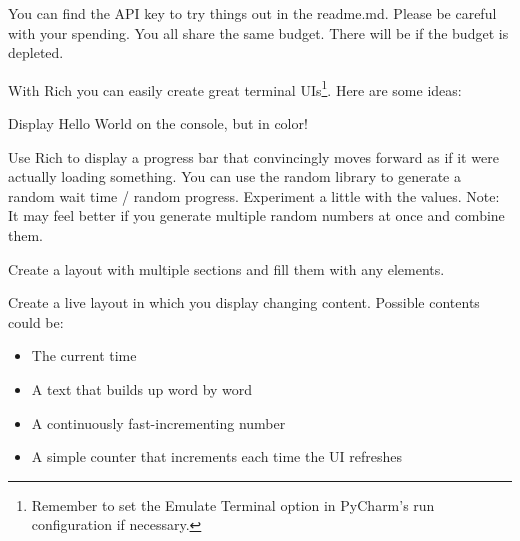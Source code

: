 \documentclass{config/minimal_uebungszettel}
\theoremstyle{definition}
\begin{document}
		You can find the API key to try things out in the readme.md.\newline
		Please be careful with your spending. You all share the same budget. There will be  if the budget is depleted.


\medskip

\newpage
\begin{aufg}[Rich] \quad
	With Rich you can easily create great terminal UIs\footnote{Remember to set the Emulate Terminal option in PyCharm's run configuration if necessary.}. 
	\newline
	Here are some ideas:\newline
	
	\noindent {} \quad
	
	\noindent Display Hello World on the console, but in color!
	
	\medskip
	\medskip
	
	\noindent {} \quad
	
	\noindent Use Rich to display a progress bar that convincingly moves forward as if it were actually loading something. You can use the random library to generate a random wait time / random progress. Experiment a little with the values.\newline
	Note: It may feel better if you generate multiple random numbers at once and combine them.
	
	\medskip
	\medskip
	
	\noindent {} \quad
	
	\noindent Create a layout with multiple sections and fill them with any elements.
	
	\medskip
	\medskip
	
	\noindent {} \quad
	
	Create a live layout in which you display changing content.\newline
	Possible contents could be:
	\begin{itemize}
		\item The current time
		\item A text that builds up word by word
		\item A continuously fast-incrementing number
		\item A simple counter that increments each time the UI refreshes
	\end{itemize}
	
	\medskip
	\medskip
	
	\noindent {} \quad
	

\end{aufg}
\end{document}
